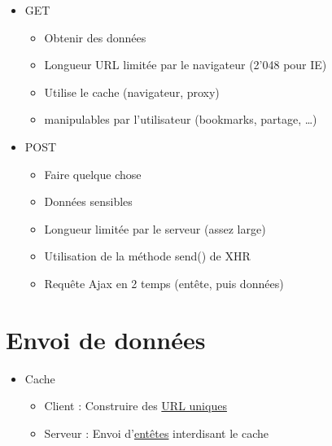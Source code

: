 \begin{itemize}
\tightlist
\item
  GET

  \begin{itemize}
  \tightlist
  \item
    {Obtenir des données}
  \item
    Longueur URL limitée par le navigateur (2'048 pour IE)
  \item
    Utilise le cache (navigateur, proxy)
  \item
    manipulables par l'utilisateur (bookmarks, partage, \ldots)
  \end{itemize}
\item
  POST

  \begin{itemize}
  \tightlist
  \item
    {Faire quelque chose}
  \item
    Données sensibles
  \item
    Longueur limitée par le serveur (assez large)
  \item
    Utilisation de la méthode send() de XHR
  \item
    Requête Ajax en 2 temps (entête, puis données)
  \end{itemize}
\end{itemize}

\hypertarget{envoi-de-donnuxe9es-1}{%
\section{Envoi de données}\label{envoi-de-donnuxe9es-1}}

\begin{itemize}
\tightlist
\item
  Cache

  \begin{itemize}
  \tightlist
  \item
    Client : Construire des
    \href{http://stackoverflow.com/questions/367786/prevent-browser-caching-of-jquery-ajax-call-result}{URL
    uniques}
  \item
    Serveur : Envoi
    d'\href{https://developers.google.com/web/fundamentals/performance/optimizing-content-efficiency/http-caching}{entêtes}
    interdisant le cache
  \end{itemize}
\end{itemize}


